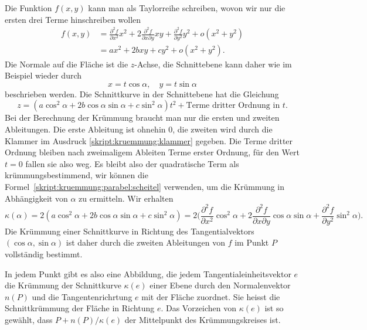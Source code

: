Die Funktion $f(x,y)$ kann man als Taylorreihe schreiben, wovon wir nur
die ersten drei Terme hinschreiben wollen
\begin{align*}
f(x,y)
&=
\frac{\partial^2 f}{\partial x^2}x^2
+
2\frac{\partial^2 f}{\partial x\partial y}xy
+
\frac{\partial^2 f}{\partial y^2}y^2
+
o(x^2+y^2)
\\
&=
ax^2 + 2bxy + cy^2 + o(x^2+y^2).
\end{align*}
Die Normale auf die Fläche ist die $z$-Achse, die Schnittebene kann
daher wie im Beispiel wieder durch
\[
x=t\cos\alpha,\quad y=t\sin\alpha
\]
beschrieben werden.
Die Schnittkurve in der Schnittebene hat die Gleichung
\begin{equation}
z
=
(a\cos^2\alpha + 2b\cos\alpha\sin\alpha  + c\sin^2\alpha)t^2
+
\text{Terme dritter Ordnung in $t$}.
\label{skript:kruemmung:klammer}
\end{equation}
Bei der Berechnung der Krümmung braucht man nur die ersten und zweiten
Ableitungen. 
Die erste Ableitung ist ohnehin $0$, die zweiten wird durch die Klammer
im Ausdruck \eqref{skript:kruemmung:klammer} gegeben.
Die Terme dritter Ordnung bleiben nach zweimaligem Ableiten Terme erster
Ordnung, für den Wert $t=0$ fallen sie also weg.
Es bleibt also der quadratische Term als krümmungsbestimmend, wir
können die Formel~\eqref{skript:kruemmung:parabel:scheitel} verwenden, um die
Krümmung in Abhängigkeit von $\alpha$ zu ermitteln.
Wir erhalten
\begin{equation}
\kappa(\alpha)
=
2(a\cos^2\alpha + 2b\cos\alpha\sin\alpha + c\sin^2 \alpha)
=
2\biggl(
\frac{\partial^2 f}{\partial x^2}\cos^2\alpha
+
2\frac{\partial^2 f}{\partial x\partial y}\cos\alpha\sin\alpha
+
\frac{\partial^2 f}{\partial y^2}\sin^2 \alpha
\biggr).
\label{skript:kurve:kruemmungalpha}
\end{equation}
Die Krümmung einer Schnittkurve in Richtung des Tangentialvektors
$(\cos\alpha,\sin\alpha)$ ist daher durch die zweiten Ableitungen von
$f$ im Punkt $P$ vollständig bestimmt.

\begin{definition}
In jedem Punkt gibt es also eine Abbildung, die jedem
Tangentialeinheitsvektor $e$
die Krümmung der Schnittkurve $\kappa(e)$ einer Ebene durch den Normalenvektor
$n(P)$ und die Tangentenrichrtung $e$ mit der Fläche zuordnet.
Sie heisst die Schnittkrümmung der Fläche in Richtung $e$.
Das Vorzeichen von $\kappa(e)$ ist so gewählt, dass $P+n(P)/\kappa(e)$ der
Mittelpunkt des Krümmungskreises ist.
\end{definition}

